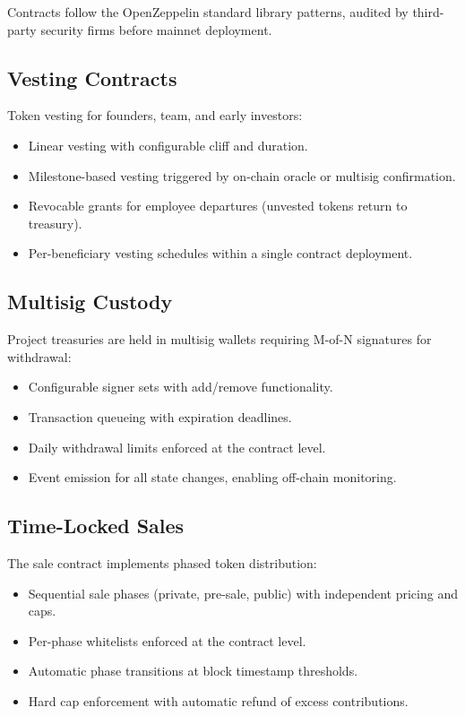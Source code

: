 \documentclass[11pt,letterpaper]{article}
\begin{document}
Contracts follow the OpenZeppelin standard library patterns, audited by
third-party security firms before mainnet deployment.

\subsection{Vesting Contracts}

Token vesting for founders, team, and early investors:

\begin{itemize}[leftmargin=1.2em]
    \item Linear vesting with configurable cliff and duration.
    \item Milestone-based vesting triggered by on-chain oracle or multisig
    confirmation.
    \item Revocable grants for employee departures (unvested tokens return to
    treasury).
    \item Per-beneficiary vesting schedules within a single contract deployment.
\end{itemize}

\subsection{Multisig Custody}

Project treasuries are held in multisig wallets requiring M-of-N signatures
for withdrawal:

\begin{itemize}[leftmargin=1.2em]
    \item Configurable signer sets with add/remove functionality.
    \item Transaction queueing with expiration deadlines.
    \item Daily withdrawal limits enforced at the contract level.
    \item Event emission for all state changes, enabling off-chain monitoring.
\end{itemize}

\subsection{Time-Locked Sales}

The sale contract implements phased token distribution:

\begin{itemize}[leftmargin=1.2em]
    \item Sequential sale phases (private, pre-sale, public) with independent
    pricing and caps.
    \item Per-phase whitelists enforced at the contract level.
    \item Automatic phase transitions at block timestamp thresholds.
    \item Hard cap enforcement with automatic refund of excess contributions.
\end{itemize}
\end{document}
